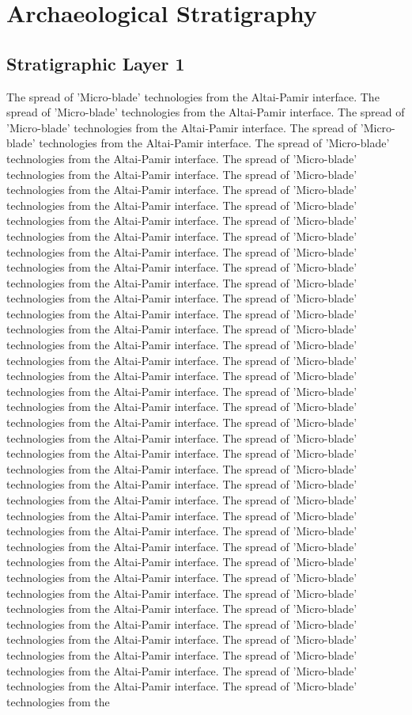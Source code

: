 \chapter{Archaeological Stratigraphy}
\section{Stratigraphic Layer 1}
The spread of 'Micro-blade' technologies from the Altai-Pamir interface. The spread of 'Micro-blade' technologies from the Altai-Pamir interface. The spread of 'Micro-blade' technologies from the Altai-Pamir interface. The spread of 'Micro-blade' technologies from the Altai-Pamir interface. The spread of 'Micro-blade' technologies from the Altai-Pamir interface. The spread of 'Micro-blade' technologies from the Altai-Pamir interface. The spread of 'Micro-blade' technologies from the Altai-Pamir interface. The spread of 'Micro-blade' technologies from the Altai-Pamir interface. The spread of 'Micro-blade' technologies from the Altai-Pamir interface. The spread of 'Micro-blade' technologies from the Altai-Pamir interface. The spread of 'Micro-blade' technologies from the Altai-Pamir interface. The spread of 'Micro-blade' technologies from the Altai-Pamir interface. The spread of 'Micro-blade' technologies from the Altai-Pamir interface. The spread of 'Micro-blade' technologies from the Altai-Pamir interface. The spread of 'Micro-blade' technologies from the Altai-Pamir interface. The spread of 'Micro-blade' technologies from the Altai-Pamir interface. The spread of 'Micro-blade' technologies from the Altai-Pamir interface. The spread of 'Micro-blade' technologies from the Altai-Pamir interface. The spread of 'Micro-blade' technologies from the Altai-Pamir interface. The spread of 'Micro-blade' technologies from the Altai-Pamir interface. The spread of 'Micro-blade' technologies from the Altai-Pamir interface. The spread of 'Micro-blade' technologies from the Altai-Pamir interface. The spread of 'Micro-blade' technologies from the Altai-Pamir interface. The spread of 'Micro-blade' technologies from the Altai-Pamir interface. The spread of 'Micro-blade' technologies from the Altai-Pamir interface. The spread of 'Micro-blade' technologies from the Altai-Pamir interface. The spread of 'Micro-blade' technologies from the Altai-Pamir interface. The spread of 'Micro-blade' technologies from the Altai-Pamir interface. The spread of 'Micro-blade' technologies from the Altai-Pamir interface. The spread of 'Micro-blade' technologies from the Altai-Pamir interface. The spread of 'Micro-blade' technologies from the Altai-Pamir interface. The spread of 'Micro-blade' technologies from the Altai-Pamir interface. The spread of 'Micro-blade' technologies from the Altai-Pamir interface. The spread of 'Micro-blade' technologies from the Altai-Pamir interface. The spread of 'Micro-blade' technologies from the Altai-Pamir interface. The spread of 'Micro-blade' technologies from the Altai-Pamir interface. The spread of 'Micro-blade' technologies from the Altai-Pamir interface. The spread of 'Micro-blade' technologies from the Altai-Pamir interface. The spread of 'Micro-blade' technologies from the Altai-Pamir interface. The spread of 'Micro-blade' technologies from the 
